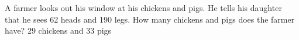 {A farmer looks out his window at his chickens and pigs. He tells his daughter that he sees 62 heads and 190 legs. How many chickens and pigs does the farmer have?}
{29 chickens and 33 pigs}